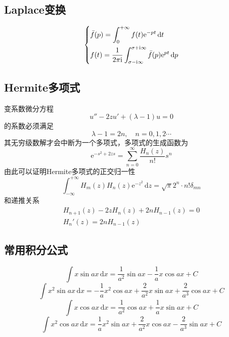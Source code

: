 \subsection{Laplace变换}
\begin{equation}\label{拉普拉斯变换}
    \begin{dcases}
        \bar{f}(p)=\int_{0}^{+\infty}f(t)\mathrm{e}^{-pt}\,\mathrm{d}t \\
        f(t)=\frac{1}{2\pi\mathrm{i}}\int_{\sigma-\mathrm{i}\infty}^{\sigma+\mathrm{i}\infty}\bar{f}(p)\mathrm{e}^{pt}\,\mathrm{d}p
    \end{dcases}
\end{equation}


\subsection{Hermite多项式}
变系数微分方程
\begin{equation}
    u''-2zu'+(\lambda-1)u=0
\end{equation}
的系数必须满足
\begin{equation}\label{变系数微分方程有解的条件}
    \lambda-1=2n, \quad n=0,1,2\cdots
\end{equation}
其无穷级数解才会中断为一个多项式，多项式的生成函数为
\begin{equation}\label{hermite多项式的生成函数}
    \mathrm{e}^{-s^2+2zs}=\sum_{n=0}^{\infty}\frac{H_n(z)}{n!}s^n
\end{equation}
由此可以证明Hermite多项式的正交归一性
\begin{equation}\label{hermite多项式的正交归一性}
    \int_{-\infty}^{+\infty}H_m(z)H_n(z)\mathrm{e}^{-z^2}\,\mathrm{d}z=\sqrt{\pi}2^n\cdot n!\delta_{mn}
\end{equation}
和递推关系
\begin{gather}\label{hermite多项式的递推关系}
    H_{n+1}(z)-2zH_n(z)+2nH_{n-1}(z)=0  \\
    H_n'(z)=2nH_{n-1}(z)
\end{gather}

\subsection{常用积分公式}\label{常用积分公式}
\begin{equation}
    \int x\sin{ax} \,\mathrm{d}x = \frac{1}{a^2}\sin{ax}-\frac{1}{a}x\cos{ax}+C
\end{equation}
\begin{equation}
    \int x^2\sin{ax}\,\mathrm{d}x = -\frac{1}{a}x^2\cos{ax}+\frac{2}{a^2}x\sin{ax}+\frac{2}{a^3}\cos{ax}+C
\end{equation}
\begin{equation}
    \int x\cos{ax}\,\mathrm{d}x = \frac{1}{a^2}\cos{ax}+\frac{1}{a}x\sin{ax}+C
\end{equation}
\begin{equation}
    \int x^2\cos{ax}\,\mathrm{d}x = \frac{1}{a}x^2\sin{ax}+\frac{2}{a^2}x\cos{ax}-\frac{2}{a^3}\sin{ax}+C
\end{equation}



